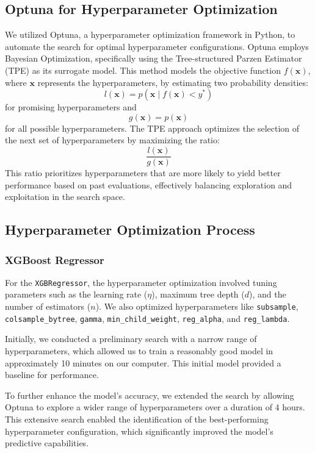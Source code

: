 \documentclass[12pt]{article}
\begin{document}
\subsection{Optuna for Hyperparameter Optimization}

We utilized Optuna, a hyperparameter optimization framework in Python, to automate the search for optimal hyperparameter configurations. Optuna employs Bayesian Optimization, specifically using the Tree-structured Parzen Estimator (TPE) as its surrogate model. This method models the objective function $f(\mathbf{x})$, where $\mathbf{x}$ represents the hyperparameters, by estimating two probability densities:
\[
l(\mathbf{x}) = p(\mathbf{x} \mid f(\mathbf{x}) < y^*)
\]
for promising hyperparameters and
\[
g(\mathbf{x}) = p(\mathbf{x})
\]
for all possible hyperparameters. The TPE approach optimizes the selection of the next set of hyperparameters by maximizing the ratio:
\[
\frac{l(\mathbf{x})}{g(\mathbf{x})}
\]
This ratio prioritizes hyperparameters that are more likely to yield better performance based on past evaluations, effectively balancing exploration and exploitation in the search space.

\subsection{Hyperparameter Optimization Process}

\subsubsection{XGBoost Regressor}

For the \texttt{XGBRegressor}, the hyperparameter optimization involved tuning parameters such as the learning rate ($\eta$), maximum tree depth ($d$), and the number of estimators ($n$). We also optimized hyperparameters like \texttt{subsample}, \texttt{colsample\_bytree}, \texttt{gamma}, \texttt{min\_child\_weight}, \texttt{reg\_alpha}, and \texttt{reg\_lambda}.

Initially, we conducted a preliminary search with a narrow range of hyperparameters, which allowed us to train a reasonably good model in approximately 10 minutes on our computer. This initial model provided a baseline for performance.

To further enhance the model's accuracy, we extended the search by allowing Optuna to explore a wider range of hyperparameters over a duration of 4 hours. This extensive search enabled the identification of the best-performing hyperparameter configuration, which significantly improved the model's predictive capabilities.
\end{document}

